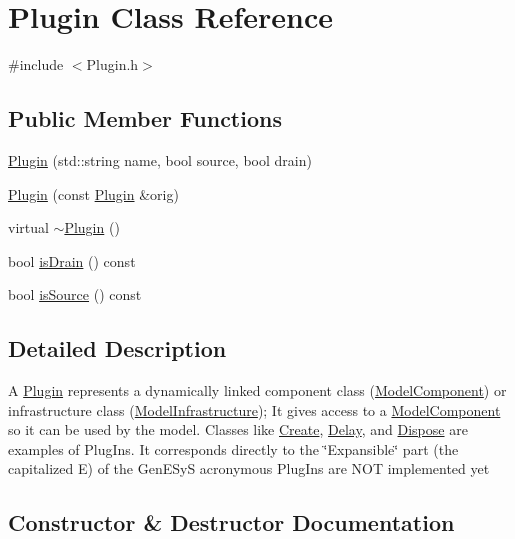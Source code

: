 \hypertarget{class_plugin}{}\section{Plugin Class Reference}
\label{class_plugin}


{\ttfamily \#include $<$Plugin.\+h$>$}

\subsection*{Public Member Functions}
\begin{DoxyCompactItemize}
\item 
\hyperlink{class_plugin_a1180a8be15f3a920f1044e528d807ea1}{Plugin} (std\+::string name, bool source, bool drain)
\item 
\hyperlink{class_plugin_acececc8908162c6b0c883e62995abad8}{Plugin} (const \hyperlink{class_plugin}{Plugin} \&orig)
\item 
virtual \hyperlink{class_plugin_aee4cc1864a2afa84a9ad935153f3fe39}{$\sim$\+Plugin} ()
\item 
bool \hyperlink{class_plugin_a1f1610d1eee7009dedf030f8495ab748}{is\+Drain} () const 
\item 
bool \hyperlink{class_plugin_a87ed4a6c7eab8e84a650c4e057f15dd1}{is\+Source} () const 
\end{DoxyCompactItemize}


\subsection{Detailed Description}
A \hyperlink{class_plugin}{Plugin} represents a dynamically linked component class (\hyperlink{class_model_component}{Model\+Component}) or infrastructure class (\hyperlink{class_model_infrastructure}{Model\+Infrastructure}); It gives access to a \hyperlink{class_model_component}{Model\+Component} so it can be used by the model. Classes like \hyperlink{class_create}{Create}, \hyperlink{class_delay}{Delay}, and \hyperlink{class_dispose}{Dispose} are examples of Plug\+Ins. It corresponds directly to the \char`\"{}\+Expansible\char`\"{} part (the capitalized \textquotesingle{}E\textquotesingle{}) of the Gen\+E\+SyS acronymous Plug\+Ins are N\+OT implemented yet 

\subsection{Constructor \& Destructor Documentation}
